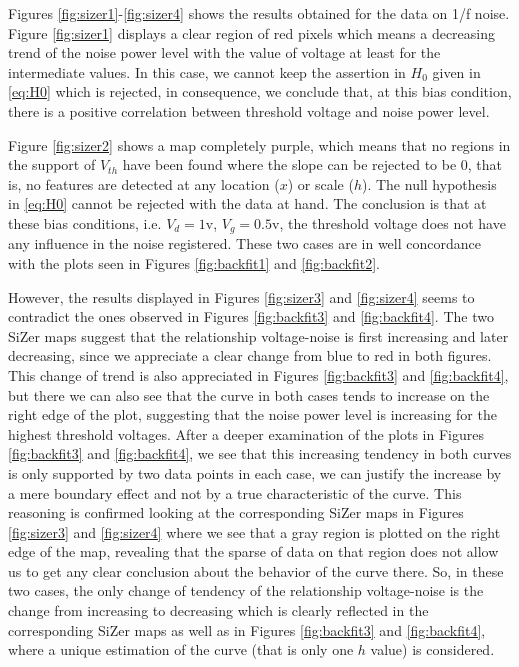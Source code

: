 \documentclass[sn-mathphys]{sn-jnl}%
\theoremstyle{thmstyleone}%
\theoremstyle{thmstyletwo}%
\theoremstyle{thmstylethree}%
\begin{document}
Figures \ref{fig:sizer1}-\ref{fig:sizer4} shows the results obtained for the data on 1/f noise. Figure \ref{fig:sizer1} displays a clear region of red pixels which means a decreasing trend of the noise power level with the value of voltage at least for the intermediate values. In this case, we cannot keep the assertion in $H_0$ given in \eqref{eq:H0} which is rejected, in consequence, we conclude that, at this bias condition, there is a positive correlation between threshold voltage and noise power level.

Figure \ref{fig:sizer2} shows a map completely purple, which means that no regions in the support of $V_{th}$ have been found where the slope can be rejected to be 0, that is, no features are detected at any location ($x$) or scale ($h$). The null hypothesis in \eqref{eq:H0} cannot be rejected with the data at hand. The conclusion is that at these bias conditions, i.e. $V_d=1$v, $V_g=0.5$v, the threshold voltage does not have any influence in the noise registered. These two cases are in well concordance with the plots seen in Figures \ref{fig:backfit1} and \ref{fig:backfit2}.

However, the results displayed in Figures  \ref{fig:sizer3} and \ref{fig:sizer4} seems to contradict the ones observed in Figures \ref{fig:backfit3} and \ref{fig:backfit4}. The two SiZer maps suggest that the relationship voltage-noise is first increasing and later decreasing, since we appreciate a clear change from blue to red in both figures. This change of trend is also appreciated in Figures \ref{fig:backfit3} and \ref{fig:backfit4}, but there we can also see that the curve in both cases tends to increase on the right edge of the plot, suggesting that the noise power level is increasing for the highest threshold voltages. After a deeper examination of the plots in Figures \ref{fig:backfit3} and \ref{fig:backfit4},  we see that this increasing tendency in both curves is only supported by two data points in each case, we can justify the increase by a mere boundary effect and not by a true characteristic of the curve. This reasoning is confirmed looking at the corresponding SiZer maps in  Figures  \ref{fig:sizer3} and \ref{fig:sizer4} where we see that a gray region is plotted on the right edge of the map, revealing that the sparse of data on that region does not allow us to get any clear conclusion about the behavior of the curve there. So, in these two cases, the only change of tendency of the relationship voltage-noise is the change from  increasing to decreasing which is clearly reflected in the corresponding SiZer maps as well as in Figures \ref{fig:backfit3} and \ref{fig:backfit4}, where a unique estimation of the curve (that is only one $h$ value) is considered.
\end{document}
